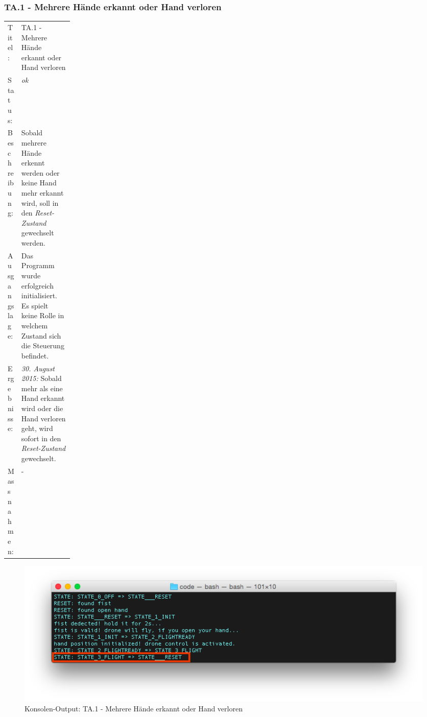 \subsubsection{TA.1 - Mehrere Hände erkannt oder Hand verloren}
\begin{table}[H]
	\centering
	\small\renewcommand{\arraystretch}{1.4}
	\begin{tabularx}{0.9\textwidth}{ L{0.15\linewidth} | X  }%
		\hline
		Titel: & TA.1 - Mehrere Hände erkannt oder Hand verloren\\
		Status: & \textit{ok}\\
		Beschreibung: &  Sobald mehrere Hände erkennt werden oder keine Hand mehr erkannt wird, soll in den \textit{Reset-Zustand} gewechselt werden.\\
		Ausgangslage: & Das Programm wurde erfolgreich initialisiert. Es spielt keine Rolle in welchem Zustand sich die Steuerung befindet.\\
		Ergebnisse: & \textit{30. August 2015:}
		Sobald mehr als eine Hand erkannt wird oder die Hand verloren geht, wird sofort in den \textit{Reset-Zustand} gewechselt.
		\\
		Massnahmen: & -\\
		\hline
	\end{tabularx}
\end{table}
\begin{figure}[H]
	\centering
	\includegraphics[width=1.0\textwidth]{images/testing/ta_1_lost_multi_hand_2_edit.png}
	\caption{Konsolen-Output: TA.1 - Mehrere Hände erkannt oder Hand verloren}
	\vspace{-1\baselineskip}
\end{figure}

\newpage
